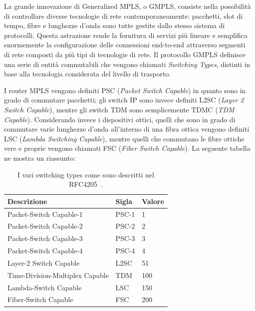 \documentclass[10pt,a4paper]{report}
\begin{document}
La grande innovazione di Generalized MPLS, o GMPLS, consiste nella
possibilità di controllare diverse tecnologie di rete
contemporaneamente: pacchetti, slot di tempo, fibre e lunghezze d'onda
sono tutte gestite dallo stesso sistema di protocolli. Questa
astrazione rende la fornitura di servizi più lineare e semplifica
enormemente la configurazione delle connessioni end-to-end attraverso
segmenti di rete composti da più tipi di tecnologie di rete. Il
protocollo GMPLS definisce una serie di entità commutabili che vengono
chiamati \textit{Switching Types}, distinti in base alla tecnologia
considerata del livello di trasporto. 

I router MPLS vengono definiti PSC (\textit{Packet Switch Capable}) in
quanto sono in grado di commutare pacchetti; gli switch IP sono invece
definiti L2SC (\textit{Layer 2 Switch Capable}), mentre gli switch TDM
sono semplicemente TDMC (\textit{TDM Capable}). Considerando invece i
dispositivi ottici, quelli che sono in grado di commutare varie
lunghezze d'onda all'interno di una fibra ottica vengono definiti LSC
(\textit{Lambda Switching Capable}), mentre quelli che commutano le
fibre ottiche vere e proprie vengono chiamati FSC (\textit{Fiber
  Switch Capable}). La seguente tabella ne mostra un riassunto:

\begin{table}[!htbp]
  \begin{center}
    \begin{tabular}{|l|l|l|}
      \hline
      Descrizione & Sigla & Valore \\ \hline
      Packet-Switch Capable-1 & PSC-1 & 1 \\
      Packet-Switch Capable-2 & PSC-2 & 2 \\
      Packet-Switch Capable-3 & PSC-3 & 3 \\
      Packet-Switch Capable-4 & PSC-4 & 4 \\
      Layer-2 Switch Capable & L2SC & 51 \\
      Time-Division-Multiplex Capable & TDM & 100 \\
      Lambda-Switch Capable & LSC & 150 \\
      Fiber-Switch Capable & FSC & 200 \\
      \hline
    \end{tabular}
    \caption[]{ I vari switching types come sono descritti nel
      RFC4205~\cite{rfc4205}.}
  \end{center}
\end{table}
\end{document}
